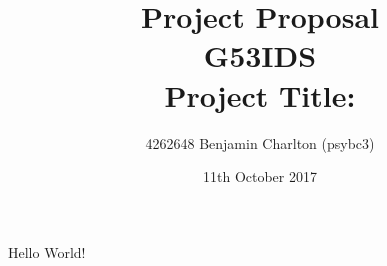 \documentclass{article}
\title{
    Project Proposal
    \\ G53IDS
    \\ Project Title: }
\author{4262648 Benjamin Charlton (psybc3)}
\date{11th October 2017}
\begin{document}
\maketitle
Hello World!
\end{document}
